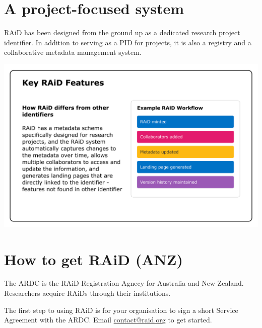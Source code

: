 \documentclass[a0,portrait]{a0poster}
\newenvironment{Figure}
  {\par\medskip\noindent\minipage{\linewidth}}
  {\endminipage\par\medskip}
\begin{document}
\begin{multicols}{3}

\color{ARDCPurple}
\section*{\LARGE A project-focused system}
\color{DarkGrey}
\large{
RAiD has been designed from the ground up as a dedicated research project identifier. In addition to serving as a PID for projects, it is also a registry and a collaborative metadata management system.
}

\begin{Figure}
  \centering
  \includegraphics[width=\linewidth]{figures/raid-key-features.png}
  \label{key-features}
\end{Figure}

\color{ARDCBlue}
\section*{\LARGE How to get RAiD (ANZ)}
\color{DarkGrey}
\large{
The ARDC is the RAiD Registration Agnecy for Australia and New Zealand. Researchers acquire RAiDs through their institutions. 

The first step to using RAiD is for your organisation to sign a short Service Agreement with the ARDC. Email \href{mailto:contact@raid.org}{contact@raid.org} to get started.
}


\end{multicols}
\end{document}
